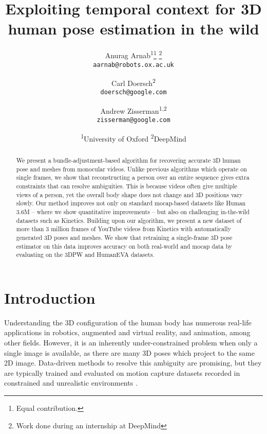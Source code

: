 \documentclass[10pt,twocolumn,letterpaper]{article}
\begin{document}
\title{Exploiting temporal context for 3D human pose estimation in the wild}

\author{Anurag Arnab\textsuperscript{1}\thanks{Equal contribution.} \hspace{0.01mm} \thanks{Work done during an internship at DeepMind}\\
	{\tt\small aarnab@robots.ox.ac.uk}
	\and
	Carl Doersch\textsuperscript{2}\footnotemark[1]\\
	{\tt\small doersch@google.com}
	\and
	Andrew Zisserman\textsuperscript{1,2}\\
	{\tt\small zisserman@google.com}
	\and 
\textsuperscript{1}University of Oxford
	\quad
	\textsuperscript{2}DeepMind
}

\maketitle


\begin{abstract}
We present a bundle-adjustment-based algorithm for recovering accurate 3D human pose and meshes from monocular videos. 
Unlike previous algorithms which operate on single frames, we show that reconstructing a person over an entire sequence gives extra constraints that can resolve ambiguities.
This is because videos often give multiple views of a person, yet the overall body shape does not change and 3D positions vary slowly.
Our method improves not only on standard mocap-based datasets like Human 3.6M -- where we show quantitative improvements -- but also on challenging in-the-wild datasets such as Kinetics.
Building upon our algorithm, we present a new dataset of more than 3 million frames of YouTube videos from Kinetics with automatically generated 3D poses and meshes.
We show that retraining a single-frame 3D pose estimator on this data improves accuracy on both real-world and mocap data by evaluating on the 3DPW and HumanEVA datasets.
\end{abstract} 
\section{Introduction}

Understanding the 3D configuration of the human body has numerous real-life applications in robotics, augmented and virtual reality, and animation, among other fields.
However, it is an inherently under-constrained problem when only a single image is available, as there are many 3D poses which project to the same 2D image.
Data-driven methods to resolve this ambiguity are promising, but they are typically trained and evaluated on motion capture datasets recorded in constrained and unrealistic environments \cite{ionescu_pami_2014, sigal_ijcv_2010, mehta_3dv_2017, joo_iccv_2015}.
\end{document}
